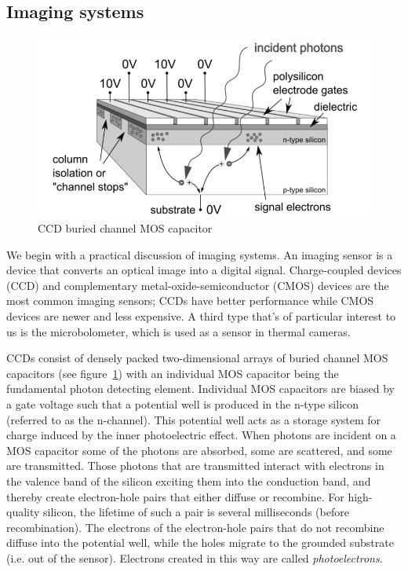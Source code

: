 \subsection{Imaging systems}\label{subsec:imaging-systems}
\begin{figure}
    \includegraphics[width=\linewidth,keepaspectratio]{figures/bccd.png}
    \caption{CCD buried channel MOS capacitor\cite{finaltestguideline}}
    \label{fig:mos-cap}
\end{figure}
We begin with a practical discussion of imaging systems. An imaging sensor is a device that converts an optical image into a digital signal.
%
Charge-coupled devices (CCD) and complementary metal-oxide-semiconductor (CMOS) devices are the most common imaging sensors; CCDs have better performance while CMOS devices are newer and less expensive.
%
A third type that's of particular interest to us is the microbolometer, which is used as a sensor in thermal cameras.

CCDs consist of densely packed two-dimensional arrays of buried channel MOS capacitors (see figure~\ref{fig:mos-cap}) with an individual MOS capacitor being the fundamental photon detecting element.
%
Individual MOS capacitors are biased by a gate voltage such that a potential well is produced in the n-type silicon (referred to as the n-channel).
%
This potential well acts as a storage system for charge induced by the inner photoelectric effect.
%
When photons are incident on a MOS capacitor some of the photons are absorbed, some are scattered, and some are transmitted.
%
Those photons that are transmitted interact with electrons in the valence band of the silicon exciting them into the conduction band, and thereby create electron-hole pairs that either diffuse or recombine.
%
For high-quality silicon, the lifetime of such a pair is several milliseconds (before recombination)\cite{scientificccd}.
%
The electrons of the electron-hole pairs that do not recombine diffuse into the potential well, while the holes migrate to the grounded substrate (i.e. out of the sensor).
%
Electrons created in this way are called \textit{photoelectrons}.

